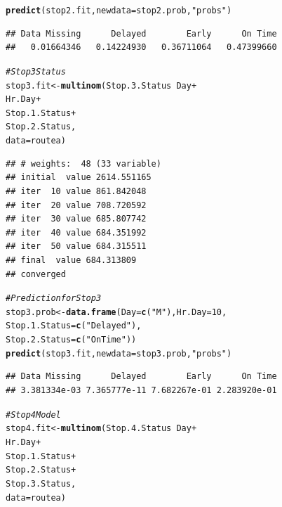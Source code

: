 \documentclass[12pt]{article}\usepackage[]{graphicx}\usepackage[]{color}
\makeatletter
\newcommand{\hlnum}[1]{\textcolor[rgb]{0.686,0.059,0.569}{#1}}%
\newcommand{\hlstr}[1]{\textcolor[rgb]{0.192,0.494,0.8}{#1}}%
\newcommand{\hlcom}[1]{\textcolor[rgb]{0.678,0.584,0.686}{\textit{#1}}}%
\newcommand{\hlopt}[1]{\textcolor[rgb]{0,0,0}{#1}}%
\newcommand{\hlstd}[1]{\textcolor[rgb]{0.345,0.345,0.345}{#1}}%
\newcommand{\hlkwb}[1]{\textcolor[rgb]{0.69,0.353,0.396}{#1}}%
\newcommand{\hlkwc}[1]{\textcolor[rgb]{0.333,0.667,0.333}{#1}}%
\newcommand{\hlkwd}[1]{\textcolor[rgb]{0.737,0.353,0.396}{\textbf{#1}}}%
\newenvironment{kframe}{%
 \def\at@end@of@kframe{}%
 \ifinner\ifhmode%
  \def\at@end@of@kframe{\end{minipage}}%
  \begin{minipage}{\columnwidth}%
 \fi\fi%
 \def\FrameCommand##1{\hskip\@totalleftmargin \hskip-\fboxsep
 \colorbox{shadecolor}{##1}\hskip-\fboxsep
     \hskip-\linewidth \hskip-\@totalleftmargin \hskip\columnwidth}%
 \MakeFramed {\advance\hsize-\width
   \@totalleftmargin\z@ \linewidth\hsize
   \@setminipage}}%
 {\par\unskip\endMakeFramed%
 \at@end@of@kframe}
\newenvironment{knitrout}{}{} %
\makeatother
\begin{document}
\begin{knitrout}
\begin{kframe}
\begin{alltt}
\hlkwd{predict}\hlstd{(stop2.fit,}\hlkwc{newdata} \hlstd{= stop2.prob,}\hlstr{"probs"}\hlstd{)}
\end{alltt}
\begin{verbatim}
## Data Missing      Delayed        Early      On Time 
##   0.01664346   0.14224930   0.36711064   0.47399660
\end{verbatim}
\begin{alltt}
\hlcom{#Stop 3 Status}
\hlstd{stop3.fit}\hlkwb{<-}\hlkwd{multinom}\hlstd{(Stop.3.Status}\hlopt{~}\hlstd{Day}\hlopt{+}
                                                \hlstd{Hr.Day}\hlopt{+}
                                                \hlstd{Stop.1.Status}\hlopt{+}
                                                \hlstd{Stop.2.Status,}
                                        \hlkwc{data}\hlstd{=routea)}
\end{alltt}
\begin{verbatim}
## # weights:  48 (33 variable)
## initial  value 2614.551165 
## iter  10 value 861.842048
## iter  20 value 708.720592
## iter  30 value 685.807742
## iter  40 value 684.351992
## iter  50 value 684.315511
## final  value 684.313809 
## converged
\end{verbatim}
\begin{alltt}
\hlcom{#Prediction for Stop 3}
\hlstd{stop3.prob}\hlkwb{<-}\hlkwd{data.frame}\hlstd{(}\hlkwc{Day}\hlstd{=}\hlkwd{c}\hlstd{(}\hlstr{"M"}\hlstd{),}\hlkwc{Hr.Day}\hlstd{=}\hlnum{10}\hlstd{,}
                                           \hlkwc{Stop.1.Status}\hlstd{=}\hlkwd{c}\hlstd{(}\hlstr{"Delayed"}\hlstd{),}
                                           \hlkwc{Stop.2.Status}\hlstd{=}\hlkwd{c}\hlstd{(}\hlstr{"On Time"}\hlstd{))}
\hlkwd{predict}\hlstd{(stop3.fit,}\hlkwc{newdata} \hlstd{= stop3.prob,}\hlstr{"probs"}\hlstd{)}
\end{alltt}
\begin{verbatim}
## Data Missing      Delayed        Early      On Time 
## 3.381334e-03 7.365777e-11 7.682267e-01 2.283920e-01
\end{verbatim}
\begin{alltt}
\hlcom{# Stop 4 Model}
\hlstd{stop4.fit}\hlkwb{<-}\hlkwd{multinom}\hlstd{(Stop.4.Status}\hlopt{~}\hlstd{Day}\hlopt{+}
                                                \hlstd{Hr.Day}\hlopt{+}
                                                \hlstd{Stop.1.Status}\hlopt{+}
                                                \hlstd{Stop.2.Status}\hlopt{+}
                                                \hlstd{Stop.3.Status,}
                                        \hlkwc{data}\hlstd{=routea)}

\end{alltt}
\end{kframe}
\end{knitrout}
\end{document}
